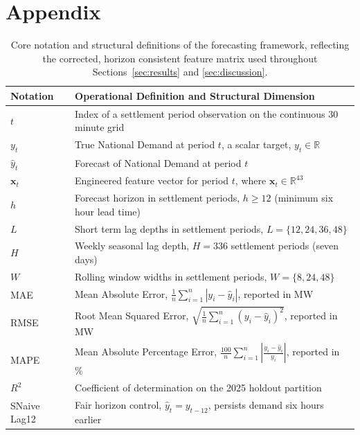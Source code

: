 \documentclass[runningheads]{llncs}
\begin{document}
\section*{Appendix}
\label{sec:appendix}

\begin{table}[H]
\centering
\caption{Core notation and structural definitions of the forecasting framework, reflecting the corrected, horizon consistent feature matrix used throughout Sections~\ref{sec:results} and \ref{sec:discussion}.}
\label{tab:core_notation}
\begin{tabular}{ll}
\toprule
\textbf{Notation} & \textbf{Operational Definition and Structural Dimension} \\
\midrule
$t$ & Index of a settlement period observation on the continuous 30 minute grid \\
$y_t$ & True National Demand at period $t$, a scalar target, $y_t \in \mathbb{R}$ \\
$\hat{y}_t$ & Forecast of National Demand at period $t$ \\
$\mathbf{x}_t$ & Engineered feature vector for period $t$, where $\mathbf{x}_t \in \mathbb{R}^{43}$ \\
$h$ & Forecast horizon in settlement periods, $h \geq 12$ (minimum six hour lead time) \\
$L$ & Short term lag depths in settlement periods, $L = \{12,24,36,48\}$ \\
$H$ & Weekly seasonal lag depth, $H = 336$ settlement periods (seven days) \\
$W$ & Rolling window widths in settlement periods, $W = \{8,24,48\}$ \\
MAE & Mean Absolute Error, $\frac{1}{n}\sum_{i=1}^{n}|y_i - \hat{y}_i|$, reported in MW \\
RMSE & Root Mean Squared Error, $\sqrt{\frac{1}{n}\sum_{i=1}^{n}(y_i - \hat{y}_i)^2}$, reported in MW \\
MAPE & Mean Absolute Percentage Error, $\frac{100}{n}\sum_{i=1}^{n}\left|\frac{y_i - \hat{y}_i}{y_i}\right|$, reported in \% \\
$R^2$ & Coefficient of determination on the 2025 holdout partition \\
SNaive Lag12 & Fair horizon control, $\hat{y}_t = y_{t-12}$, persists demand six hours earlier \\
\bottomrule
\end{tabular}
\end{table}
\end{document}
